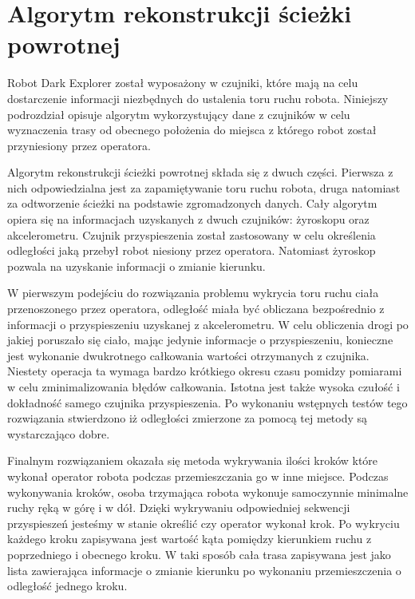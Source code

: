 \section{Algorytm rekonstrukcji ścieżki powrotnej}
\label{sec:rtrwca}
Robot Dark Explorer został wyposażony w czujniki, które mają na celu dostarczenie informacji niezbędnych do ustalenia toru ruchu robota. Niniejszy podrozdział opisuje algorytm wykorzystujący dane z czujników w celu wyznaczenia trasy od obecnego położenia do miejsca z którego robot został przyniesiony przez operatora.

Algorytm rekonstrukcji ścieżki powrotnej składa się z dwuch części. Pierwsza z nich odpowiedzialna jest za zapamiętywanie toru ruchu robota, druga natomiast za odtworzenie ścieżki na podstawie zgromadzonych danych. Cały algorytm opiera się na informacjach uzyskanych z dwuch czujników: żyroskopu oraz akcelerometru. Czujnik przyspieszenia został zastosowany w celu określenia odległości jaką przebył robot niesiony przez operatora. Natomiast żyroskop pozwala na uzyskanie informacji o zmianie kierunku.

W pierwszym podejściu do rozwiązania problemu wykrycia toru ruchu ciała przenoszonego przez operatora, odległość miała być obliczana bezpośrednio z informacji o przyspieszeniu uzyskanej z akcelerometru. W celu obliczenia drogi po jakiej poruszało się ciało, mając jedynie informacje o przyspieszeniu, konieczne jest wykonanie dwukrotnego całkowania wartości otrzymanych z czujnika. Niestety operacja ta wymaga bardzo krótkiego okresu czasu pomidzy pomiarami w celu zminimalizowania błędów całkowania. Istotna jest także wysoka czułość i dokładność samego czujnika przyspieszenia. Po wykonaniu wstępnych testów tego rozwiązania stwierdzono iż odległości zmierzone za pomocą tej metody są wystarczająco dobre.

Finalnym rozwiązaniem okazała się metoda wykrywania ilości kroków które wykonał operator robota podczas przemieszczania go w inne miejsce. Podczas wykonywania kroków, osoba trzymająca robota wykonuje samoczynnie minimalne ruchy ręką w górę i w dół. Dzięki wykrywaniu odpowiedniej sekwencji przyspieszeń jesteśmy w stanie określić czy operator wykonał krok. Po wykryciu każdego kroku zapisywana jest wartość kąta pomiędzy kierunkiem ruchu z poprzedniego i obecnego kroku. W taki sposób cała trasa zapisywana jest jako lista zawierająca informacje o zmianie kierunku po wykonaniu przemieszczenia o odległość jednego kroku.
